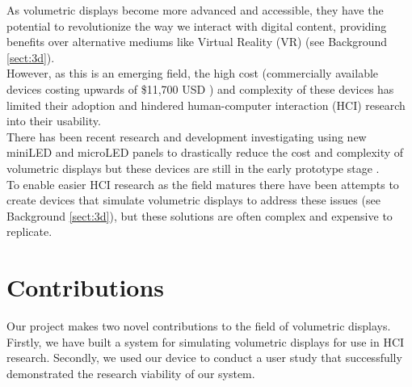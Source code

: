 As volumetric displays become more advanced and accessible, they have the potential to revolutionize the way we interact with digital content, providing benefits over alternative mediums like Virtual Reality (VR) (see Background \ref{sect:3d}). \\ 

However, as this is an emerging field, the high cost (commercially available devices costing upwards of \$11,700 USD \cite{noauthor_products_nodate}) and complexity of these devices has limited their adoption and hindered human-computer interaction (HCI) research into their usability. \\

There has been recent research and development investigating using new miniLED and microLED \cite{Huang2020} panels to drastically reduce the cost and complexity of volumetric displays but these devices are still in the early prototype stage \cite{brightvox_2023}. \\   

To enable easier HCI research as the field matures there have been attempts to create devices that simulate volumetric displays to address these issues (see Background \ref{sect:3d}), but these solutions are often complex and expensive to replicate.

\section{Contributions}

Our project makes two novel contributions to the field of volumetric displays. Firstly, we have built a system for simulating volumetric displays for use in HCI research. Secondly, we used our device to conduct a user study that successfully demonstrated the research viability of our system.

